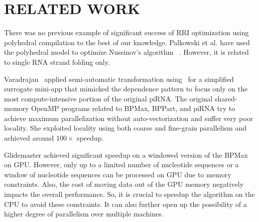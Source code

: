 \section{\uppercase{Related Work}}

There was no previous example of significant success of RRI optimization using polyhedral compilation to the best of our knowledge.  Palkowski et al. \cite{Palkowski2019} have used the polyhedral model to optimize Nussinov's algorithm ~\cite{Nussinov1978}. However, it is related to single RNA strand folding only.

Varadrajan~\cite{Varadarajan2016, Varadarajan2019} applied semi-automatic transformation using \alphaz\ for a simplified surrogate mini-app that mimicked the dependence pattern to focus only on the most compute-intensive portion of the original piRNA. The original shared-memory OpenMP programs related to BPMax, BPPart, and piRNA try to achieve maximum parallelization without auto-vectorization and suffer very poor locality. She exploited locality using both coarse and fine-grain parallelism and achieved around $100 \times$ speedup.  

Glidemaster\cite{Gildemaster2020} achieved significant speedup on a windowed version of the BPMax on GPU. However, only up to a limited number of nucleotide sequences or a window of nucleotide sequences can be processed on GPU due to memory constraints. Also, the cost of moving data out of the GPU memory negatively impacts the overall performance. So, it is crucial to speedup the algorithm on the CPU to avoid these constraints. It can also further open up the possibility of a higher degree of parallelism over multiple machines.